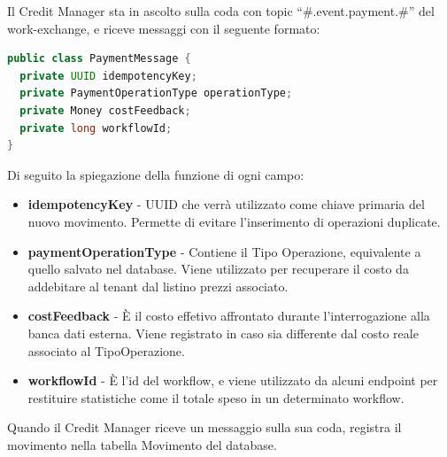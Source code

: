 Il Credit Manager sta in ascolto sulla coda con topic ``\#.event.payment.\#'' del work-exchange, e riceve messaggi con il seguente formato:
\begin{lstlisting}[language=Java]
public class PaymentMessage {
  private UUID idempotencyKey;
  private PaymentOperationType operationType;
  private Money costFeedback;
  private long workflowId;
}
\end{lstlisting}
Di seguito la spiegazione della funzione di ogni campo:
\begin{itemize}
  \item \textbf{idempotencyKey} - UUID che verr\`a utilizzato come chiave primaria del nuovo movimento. Permette di evitare l'inserimento
    di operazioni duplicate.
  \item \textbf{paymentOperationType} - Contiene il Tipo Operazione, equivalente a quello salvato nel database. Viene utilizzato per recuperare il costo da addebitare
    al tenant dal listino prezzi associato.
  \item \textbf{costFeedback} - \`E il costo effetivo affrontato durante l'interrogazione alla banca dati esterna. Viene registrato in caso sia differente dal costo reale associato al TipoOperazione.
  \item \textbf{workflowId} - \`E l'id del workflow, e viene utilizzato da alcuni endpoint per restituire statistiche come il totale speso in un determinato workflow.
\end{itemize}
Quando il Credit Manager riceve un messaggio sulla sua coda, registra il movimento nella tabella Movimento del database.

